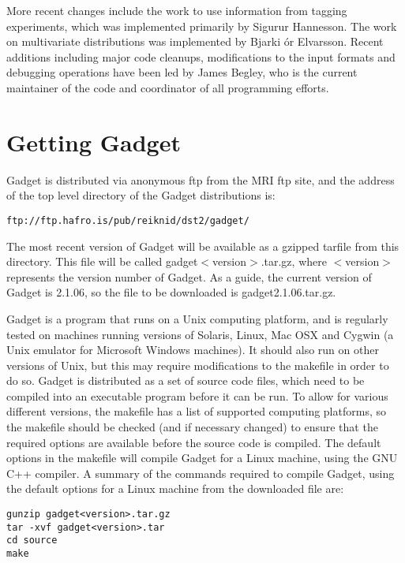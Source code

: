 \documentclass[10pt,twoside]{book}
\begin{document}
\bigskip
More recent changes include the work to use information from tagging experiments, which was implemented primarily by Sigur{\dh}ur Hannesson.  The work on multivariate distributions was implemented by Bjarki {\TH}\'{o}r Elvarsson.  Recent additions including major code cleanups, modifications to the input formats and debugging operations have been led by James Begley, who is the current maintainer of the code and coordinator of all programming efforts.

\section{Getting Gadget}\label{sec:gettinggadget}
Gadget is distributed via anonymous ftp from the MRI ftp site, and the address of the top level directory of the Gadget distributions is:

{\small\begin{verbatim}
ftp://ftp.hafro.is/pub/reiknid/dst2/gadget/
\end{verbatim}}

The most recent version of Gadget will be available as a gzipped tarfile from this directory.  This file will be called gadget$<$version$>$.tar.gz, where $<$version$>$ represents the version number of Gadget.  As a guide, the current version of Gadget is 2.1.06, so the file to be downloaded is gadget2.1.06.tar.gz.

\bigskip
Gadget is a program that runs on a Unix computing platform, and is regularly tested on machines running versions of Solaris, Linux, Mac OSX and Cygwin (a Unix emulator for Microsoft Windows machines).  It should also run on other versions of Unix, but this may require modifications to the makefile in order to do so.  Gadget is distributed as a set of source code files, which need to be compiled into an executable program before it can be run.  To allow for various different versions, the makefile has a list of supported computing platforms, so the makefile should be checked (and if necessary changed) to ensure that the required options are available before the source code is compiled.  The default options in the makefile will compile Gadget for a Linux machine, using the GNU C++ compiler.  A summary of the commands required to compile Gadget, using the default options for a Linux machine from the downloaded file are:

{\small\begin{verbatim}
gunzip gadget<version>.tar.gz
tar -xvf gadget<version>.tar
cd source
make
\end{verbatim}}
\end{document}
